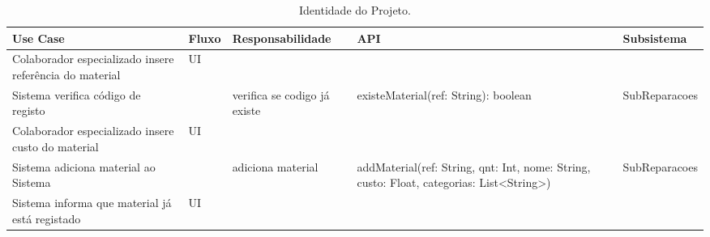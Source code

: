 \documentclass[../relatorio.tex]{subfiles}
\begin{document}
\begin{landscape}
    \begin{table}[!h]
        \centering
        \begin{tabular}{|p{5cm}|p{1cm}|p{4cm}|p{6cm}|p{3cm}|}
            \hline
            \rowcolor{gray!20!white}
            Use Case                                                & Fluxo & Responsabilidade             & API                                                                                      & Subsistema    \\
            \hline
            \rowcolor{yellow}
            Colaborador especializado insere referência do material & UI    &                              &                                                                                          &               \\
            \hline
            Sistema verifica código de registo                      &       & verifica se codigo já existe & existeMaterial(ref: String): boolean                                                     & SubReparacoes \\
            \rowcolor{yellow}
            \hline
            Colaborador especializado insere custo do material      & UI    &                              &                                                                                          &               \\
            \hline
            Sistema adiciona material ao Sistema                    &       & adiciona material            & addMaterial(ref: String, qnt: Int, nome: String, custo: Float, categorias: List<String>) & SubReparacoes \\
            \hline
            \rowcolor{yellow}
            Sistema informa que material já está registado          & UI    &                              &                                                                                          &               \\
            \hline                      
        \end{tabular}
        \caption{Identidade do Projeto.}
    \end{table}
\end{landscape}
\end{document}
